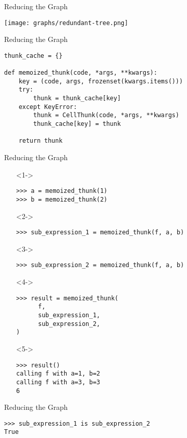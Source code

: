 \documentclass{beamer}
\begin{document}
\begin{frame}{Reducing the Graph}
  \begin{center}
    \texttt{[image: graphs/redundant-tree.png]}
   \end{center}
\end{frame}

\begin{frame}[fragile]{Reducing the Graph}
  \begin{verbatim}
thunk_cache = {}

def memoized_thunk(code, *args, **kwargs):
    key = (code, args, frozenset(kwargs.items()))
    try:
        thunk = thunk_cache[key]
    except KeyError:
        thunk = CellThunk(code, *args, **kwargs)
        thunk_cache[key] = thunk

    return thunk
  \end{verbatim}
\end{frame}

\begin{frame}[fragile]{Reducing the Graph}
  \begin{itemize}
  \item[]<1-> \begin{verbatim}
>>> a = memoized_thunk(1)
>>> b = memoized_thunk(2)
    \end{verbatim}
  \item[]<2-> \begin{verbatim}
>>> sub_expression_1 = memoized_thunk(f, a, b)
    \end{verbatim}
  \item[]<3-> \begin{verbatim}
>>> sub_expression_2 = memoized_thunk(f, a, b)
    \end{verbatim}
  \item[]<4-> \begin{verbatim}
>>> result = memoized_thunk(
      f,
      sub_expression_1,
      sub_expression_2,
)
    \end{verbatim}
  \item[]<5-> \begin{verbatim}
>>> result()
calling f with a=1, b=2
calling f with a=3, b=3
6
    \end{verbatim}
  \end{itemize}
\end{frame}

\begin{frame}[fragile]{Reducing the Graph}
  \begin{verbatim}
>>> sub_expression_1 is sub_expression_2
True
  \end{verbatim}
\end{frame}
\end{document}
